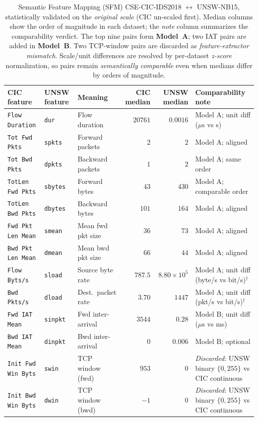 \documentclass[preprint,12pt,authoryear]{elsarticle}
\begin{document}
\begin{table}[t]
\centering
\caption{Semantic Feature Mapping (SFM) CSE-CIC-IDS2018 $\leftrightarrow$
UNSW-NB15, statistically validated on the \emph{original scale} (CIC un-scaled
first). Median columns show the order of magnitude in each dataset; the
\emph{note} column summarizes the comparability verdict. The top nine pairs form
\textbf{Model~A}; two IAT pairs are added in \textbf{Model~B}. Two TCP-window
pairs are discarded as \emph{feature-extractor mismatch}. Scale/unit differences
are resolved by per-dataset \emph{z-score} normalization, so pairs remain
\emph{semantically comparable} even when medians differ by orders of magnitude.}
\label{tab:sfm}
\small
\begin{tabular}{lllrrl}
\toprule
CIC feature & UNSW feature & Meaning & CIC median & UNSW median & Comparability note \\
\midrule
\texttt{Flow Duration}     & \texttt{dur}    & Flow duration & $20761$ & $0.0016$ & Model A; unit diff ($\mu$s vs s) \\
\texttt{Tot Fwd Pkts}      & \texttt{spkts}  & Forward packets  & $2$ & $2$ & Model A; aligned \\
\texttt{Tot Bwd Pkts}      & \texttt{dpkts}  & Backward packets & $1$ & $2$ & Model A; same order \\
\texttt{TotLen Fwd Pkts}   & \texttt{sbytes} & Forward bytes    & $43$ & $430$ & Model A; comparable order \\
\texttt{TotLen Bwd Pkts}   & \texttt{dbytes} & Backward bytes   & $101$ & $164$ & Model A; aligned \\
\texttt{Fwd Pkt Len Mean}  & \texttt{smean}  & Mean fwd pkt size & $36$ & $73$ & Model A; aligned \\
\texttt{Bwd Pkt Len Mean}  & \texttt{dmean}  & Mean bwd pkt size & $66$ & $44$ & Model A; aligned \\
\texttt{Flow Byts/s}       & \texttt{sload}  & Source byte rate  & $787.5$ & $8.80{\times}10^{5}$ & Model A; unit diff (byte/s vs bit/s)$^\dagger$ \\
\texttt{Bwd Pkts/s}        & \texttt{dload}  & Dest.\ packet rate & $3.70$ & $1447$ & Model A; unit diff (pkt/s vs bit/s)$^\dagger$ \\
\midrule
\texttt{Fwd IAT Mean}      & \texttt{sinpkt} & Fwd inter-arrival & $3544$ & $0.28$ & Model B; unit diff ($\mu$s vs ms) \\
\texttt{Bwd IAT Mean}      & \texttt{dinpkt} & Bwd inter-arrival & $0$ & $0.006$ & Model B; optional \\
\midrule
\texttt{Init Fwd Win Byts} & \texttt{swin}   & TCP window (fwd)  & $953$ & $0$ & \emph{Discarded}: UNSW binary $\{0,255\}$ vs CIC continuous \\
\texttt{Init Bwd Win Byts} & \texttt{dwin}   & TCP window (bwd)  & $-1$ & $0$ & \emph{Discarded}: UNSW binary $\{0,255\}$ vs CIC continuous \\
\bottomrule
\end{tabular}


\end{table}
\end{document}
